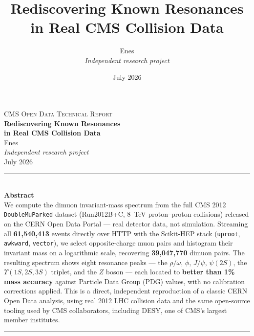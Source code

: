 \documentclass[11pt,a4paper]{article}
\title{\textbf{Rediscovering Known Resonances in Real CMS Collision Data}}
\author{Enes \\ \textit{Independent research project}}
\date{July 2026}
\begin{document}
\thispagestyle{empty}
\begin{center}
\vspace*{3cm}

{\Large \scshape CMS Open Data Technical Report}\\[1.2cm]

{\Huge \bfseries Rediscovering Known Resonances \\[0.3cm] in Real CMS Collision Data}\\[1.6cm]

{\Large Enes}\\[0.2cm]
{\large \textit{Independent research project}}\\[2.5cm]

{\large July 2026}

\vfill

\begin{minipage}{0.82\textwidth}
\centering
\rule{\textwidth}{0.4pt}\\[0.4cm]
\textbf{Abstract}\\[0.3cm]
\small
We compute the dimuon invariant-mass spectrum from the full CMS 2012 \texttt{DoubleMuParked}
dataset (Run2012B+C, 8~TeV proton--proton collisions) released on the CERN Open Data Portal ---
real detector data, not simulation. Streaming all \textbf{61,540,413} events directly over HTTP
with the Scikit-HEP stack (\texttt{uproot}, \texttt{awkward}, \texttt{vector}), we select
opposite-charge muon pairs and histogram their invariant mass on a logarithmic scale, recovering
\textbf{39,047,770} dimuon pairs. The resulting spectrum shows eight resonance peaks --- the
$\rho/\omega$, $\phi$, $J/\psi$, $\psi(2S)$, the $\Upsilon(1S,2S,3S)$ triplet, and the $Z$ boson
--- each located to \textbf{better than 1\% mass accuracy} against Particle Data Group (PDG)
values, with no calibration corrections applied. This is a direct, independent reproduction of a
classic CERN Open Data analysis, using real 2012 LHC collision data and the same open-source
tooling used by CMS collaborators, including DESY, one of CMS's largest member institutes.\\[0.3cm]
\rule{\textwidth}{0.4pt}
\end{minipage}

\vspace{1.5cm}
\end{center}
\newpage
\end{document}
